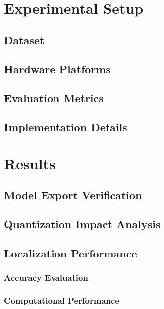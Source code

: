 \documentclass[12pt]{article}
\begin{document}
\section{Experimental Setup}

\subsection{Dataset}

\subsection{Hardware Platforms}

\subsection{Evaluation Metrics}

\subsection{Implementation Details}
\newpage
\section{Results}

\subsection{Model Export Verification}

\subsection{Quantization Impact Analysis}

\subsection{Localization Performance}

\subsubsection{Accuracy Evaluation}

\subsubsection{Computational Performance}
\end{document}

